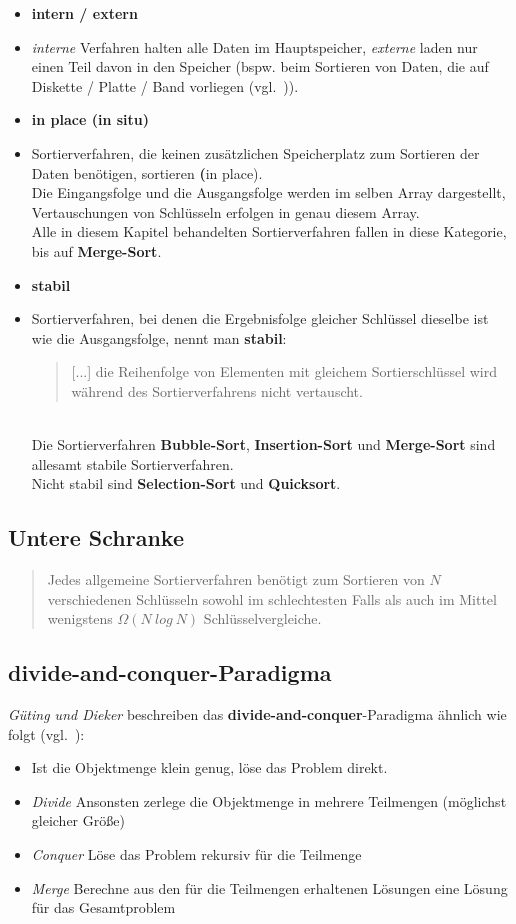 \begin{itemize}
    \item \textbf{intern / extern}
    \item[] \textit{interne} Verfahren halten alle Daten im Hauptspeicher, \textit{externe} laden nur einen Teil davon in den Speicher (bspw. beim Sortieren von Daten, die auf Diskette / Platte / Band vorliegen (vgl.~\cite[80]{OW17b})).
    \item \textbf{in place (in situ)}
    \item [] Sortierverfahren, die keinen zusätzlichen Speicherplatz zum Sortieren der Daten benötigen, sortieren \textbf(in place).\\
    Die Eingangsfolge und die Ausgangsfolge werden im selben Array dargestellt, Vertauschungen von Schlüsseln erfolgen in genau diesem Array.\\
    Alle in diesem Kapitel behandelten Sortierverfahren fallen in diese Kategorie, bis auf \textbf{Merge-Sort}.
    \item \textbf{stabil}
    \item[] Sortierverfahren, bei denen die Ergebnisfolge gleicher Schlüssel dieselbe ist wie die Ausgangsfolge, nennt man \textbf{stabil}:\blockquote[{\cite[164]{OW17b}}]{
        [...] die Reihenfolge von Elementen mit gleichem Sortierschlüssel wird während des Sortierverfahrens nicht vertauscht.
    }.\\
    Die Sortierverfahren \textbf{Bubble-Sort}, \textbf{Insertion-Sort} und \textbf{Merge-Sort} sind allesamt stabile Sortierverfahren.\\
    Nicht stabil sind \textbf{Selection-Sort} und \textbf{Quicksort}.
\end{itemize}


\subsection{Untere Schranke}

\blockquote[{\cite[154, Satz2.4]{OW17b}}]{
    Jedes allgemeine Sortierverfahren benötigt zum Sortieren von $N$ verschiedenen Schlüsseln sowohl im schlechtesten Falls als auch im Mittel wenigstens $\Omega(N\ log\ N)$ Schlüsselvergleiche.
}.


\subsection{divide-and-conquer-Paradigma}

\textit{Güting und Dieker} beschreiben das \textbf{divide-and-conquer}-Paradigma ähnlich wie folgt (vgl.~\cite[174]{GD18e}):
\begin{itemize}
    \item Ist die Objektmenge klein genug, löse das Problem direkt.
    \item \textit{Divide} Ansonsten zerlege die Objektmenge in mehrere Teilmengen (möglichst gleicher Größe)
    \item \textit{Conquer} Löse das Problem rekursiv für die Teilmenge
    \item \textit{Merge} Berechne aus den für die Teilmengen erhaltenen Lösungen eine Lösung für das Gesamtproblem
\end{itemize}